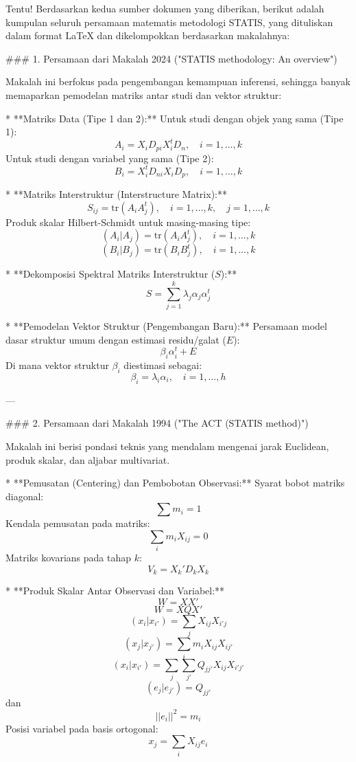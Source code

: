 Tentu! Berdasarkan kedua sumber dokumen yang diberikan, berikut adalah kumpulan seluruh persamaan matematis metodologi STATIS, yang dituliskan dalam format LaTeX dan dikelompokkan berdasarkan makalahnya:

### 1. Persamaan dari Makalah 2024 ("STATIS methodology: An overview")

Makalah ini berfokus pada pengembangan kemampuan inferensi, sehingga banyak memaparkan pemodelan matriks antar studi dan vektor struktur:

*   **Matriks Data (Tipe 1 dan 2):**
    Untuk studi dengan objek yang sama (Tipe 1):
    $$A_i = X_i D_{pi} X_i^t D_n, \quad i = 1, \dots, k$$
    Untuk studi dengan variabel yang sama (Tipe 2):
    $$B_i = X_i^t D_{ni} X_i D_p, \quad i = 1, \dots, k$$

*   **Matriks Interstruktur (Interstructure Matrix):**
    $$S_{ij} = \text{tr}(A_i A_j^t), \quad i=1,\dots,k, \quad j=1,\dots,k$$
    Produk skalar Hilbert-Schmidt untuk masing-masing tipe:
    $$(A_i|A_j) = \text{tr}(A_i A_j^t), \quad i=1,\dots,k$$
    $$(B_i|B_j) = \text{tr}(B_i B_j^t), \quad i=1,\dots,k$$

*   **Dekomposisi Spektral Matriks Interstruktur ($S$):**
    $$S = \sum_{j=1}^k \lambda_j \alpha_j \alpha_j^t$$

*   **Pemodelan Vektor Struktur (Pengembangan Baru):**
    Persamaan model dasar struktur umum dengan estimasi residu/galat ($E$):
    $$\beta_i \alpha_i^t + E$$
    Di mana vektor struktur $\beta_i$ diestimasi sebagai:
    $$\beta_i = \lambda_i \alpha_i, \quad i = 1, \dots, h$$

---

### 2. Persamaan dari Makalah 1994 ("The ACT (STATIS method)")

Makalah ini berisi pondasi teknis yang mendalam mengenai jarak Euclidean, produk skalar, dan aljabar multivariat.

*   **Pemusatan (Centering) dan Pembobotan Observasi:**
    Syarat bobot matriks diagonal:
    $$\sum m_i = 1$$
    Kendala pemusatan pada matriks:
    $$\sum_i m_i X_{ij} = 0$$
    Matriks kovarians pada tahap $k$:
    $$V_k = X_k' D_k X_k$$

*   **Produk Skalar Antar Observasi dan Variabel:**
    $$W = X X'$$
    $$W = X Q X'$$
    $$(x_i|x_{i'}) = \sum_j X_{ij} X_{i'j}$$
    $$(x_j|x_{j'}) = \sum_i m_i X_{ij} X_{ij'}$$
    $$(x_i|x_{i'}) = \sum_j \sum_{j'} Q_{jj'} X_{ij} X_{i'j'}$$
    $$(e_j|e_{j'}) = Q_{jj'}$$ dan $$||e_i||^2 = m_i$$
    Posisi variabel pada basis ortogonal:
    $$x_j = \sum_i X_{ij} e_i$$

